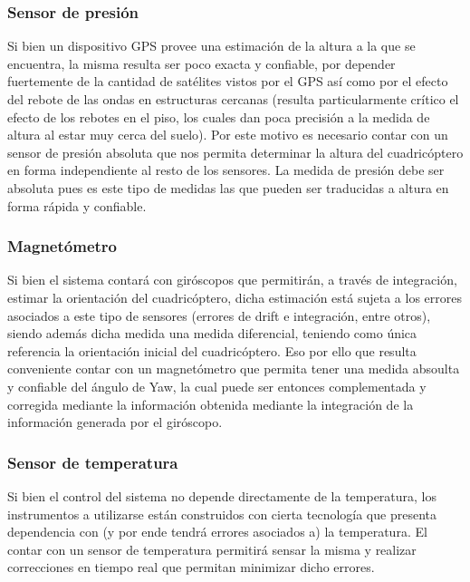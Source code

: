 \documentclass[main]{subfiles}
\begin{document}
\subsubsection{Sensor de presi\'on}

Si bien un dispositivo GPS provee una estimaci\'on de la altura a la que se encuentra, la misma resulta ser poco exacta y confiable, por depender fuertemente de la cantidad de sat\'elites vistos por el GPS as\'i como por el efecto del rebote de las ondas en estructuras cercanas (resulta particularmente cr\'itico el efecto de los rebotes en el piso, los cuales dan poca precisi\'on a la medida de altura al estar muy cerca del suelo). Por este motivo es necesario contar con un sensor de presi\'on absoluta que nos permita determinar la altura del cuadric\'optero en forma independiente al resto de los sensores. La medida de presi\'on debe ser absoluta pues es este tipo de medidas las que pueden ser traducidas a altura en forma r\'apida y confiable.

\subsubsection{Magnet\'ometro}

Si bien el sistema contar\'a con gir\'oscopos que permitir\'an, a trav\'es de integraci\'on, estimar la orientaci\'on del cuadric\'optero, dicha estimaci\'on est\'a sujeta a los errores asociados a este tipo de sensores (errores de drift e integraci\'on, entre otros), siendo adem\'as dicha medida una medida diferencial, teniendo como \'unica referencia la orientaci\'on inicial del cuadric\'optero. Eso por ello que resulta conveniente contar con un magnet\'ometro que permita tener una medida absoulta y confiable del \'angulo de Yaw, la cual puede ser entonces complementada y corregida mediante la informaci\'on obtenida mediante la integraci\'on de la informaci\'on generada por el gir\'oscopo.

\subsubsection{Sensor de temperatura}

Si bien el control del sistema no depende directamente de la temperatura, los instrumentos a utilizarse est\'an construidos con cierta tecnolog\'ia que presenta dependencia con (y por ende tendr\'a errores asociados a) la temperatura. El contar con un sensor de temperatura permitir\'a sensar la misma y realizar correcciones en tiempo real que permitan minimizar dicho errores.\\
\end{document}
